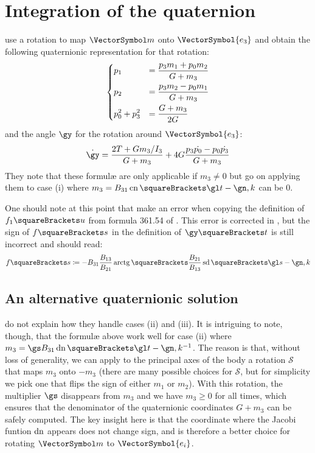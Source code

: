 \documentclass[10pt, a4paper, twoside]{basestyle}
\begin{document}
\section*{Integration of the quaternion}
\cite{Celledoni2007} use a rotation to map $\vm$ onto $\VectorSymbol{e_3}$ and obtain the following quaternionic representation for that rotation:
\[
\begin{dcases}
p_1 &= \frac{p_3 m_1 + p_0 m_2}{G + m_3} \\
p_2 &= \frac{p_3 m_2 - p_0 m_1}{G + m_3} \\
p_0^2 + p_3^2 &= \frac{G + m_3}{2 G}
\end{dcases}
\]
and the angle $\gy$ for the rotation around $\VectorSymbol{e_3}$:
\[
\TimeDerivative{\gy} = \frac{2 T + G m_3 / I_3}{G + m_3} + 4 G \frac{p_3 \TimeDerivative{p_0} - p_0 \TimeDerivative{p_3}}{G + m_3}
\]
They note that these formul{\ae} are only applicable if $m_3 \neq 0$ but go on applying them to case (i) where $m_3 = B_{31} \JacobiCN\of{\gl t - \gn, k}$
can be $0$.

One should note at this point that \cite{Celledoni2007} make an error when copying the definition of $f_1\of{u}$ from formula 361.54 of 
\cite{ByrdFriedman1954}.  This error is corrected in \cite{Celledoni2008}, but the sign of $f\of{s}$ in the definition of $\gy\of{t}$ is
still incorrect and should read:
\[
f\of{s} \DefineAs -B_{31} \frac{B_{13}}{B_{21}} \InverseTrigonometricTangent\of{\frac{B_{21}}{B_{13}} \JacobiSD\of{\gl s - \gn, k}}
\]

\subsection*{An alternative quaternionic solution}
\cite{Celledoni2007} do not explain how they handle cases (ii) and (iii).  It is intriguing to note, though, that the formul{\ae} above work well
for case (ii) where $m_3 = \gs B_{31} \JacobiDN\of{\gl t - \gn, k^{-1}}$.  The reason is that, without loss of generality, we can apply to the principal
axes of the body a rotation $\mathscr S$ that maps $m_3$ onto $-m_3$ (there are many possible choices for $\mathscr S$, but for simplicity we pick one that flips the sign of
either $m_1$ or $m_2$).  With this rotation, the multiplier $\gs$ disappears from $m_3$ and we have $m_3 \geq 0$ for all times, which ensures that
the denominator of the quaternionic coordinates $G + m_3$ can be safely computed.  The key insight here is that the coordinate where the Jacobi funtion
$\operatorname{dn}$ appears does not change sign, and is therefore a better choice for rotating $\vm$ to $\VectorSymbol{e_i}$.
\end{document}
